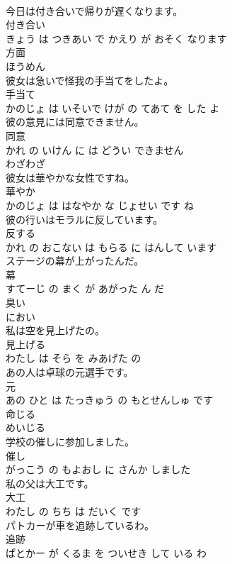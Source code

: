 \documentclass[8pt]{extreport}
\begin{document}
\begin{CJK}{UTF8}{min}
\\	今日は付き合いで帰りが遅くなります。	
\\	付き合い 
\\	きょう は つきあい で かえり が おそく なります			
\\	方面	
\\	ほうめん			
\\	彼女は急いで怪我の手当てをしたよ。	
\\	手当て 
\\	かのじょ は いそいで けが の てあて を した よ			
\\	彼の意見には同意できません。	
\\	同意 
\\	かれ の いけん に は どうい できません			
\\	わざわざ	
\\	彼女は華やかな女性ですね。	
\\	華やか 
\\	かのじょ は はなやか な じょせい です ね			
\\	彼の行いはモラルに反しています。	
\\	反する 
\\	かれ の おこない は もらる に はんして います			
\\	ステージの幕が上がったんだ。	
\\	幕 
\\	すてーじ の まく が あがった ん だ			
\\	臭い	
\\	におい			
\\	私は空を見上げたの。	
\\	見上げる 
\\	わたし は そら を みあげた の			
\\	あの人は卓球の元選手です。	
\\	元 
\\	あの ひと は たっきゅう の もとせんしゅ です			
\\	命じる	
\\	めいじる			
\\	学校の催しに参加しました。	
\\	催し 
\\	がっこう の もよおし に さんか しました			
\\	私の父は大工です。	
\\	大工 
\\	わたし の ちち は だいく です			
\\	パトカーが車を追跡しているわ。	
\\	追跡 
\\	ぱとかー が くるま を ついせき して いる わ			

\end{CJK}
\end{document}
